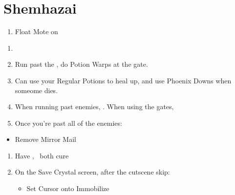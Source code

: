 \chapter{Shemhazai}

\begin{enumerate}
\item Float Mote on \vaan
\end{enumerate}
\begin{menu}
\party{\vaan, \basch}
\begin{itemize}
\battleslow
\end{itemize}
\end{menu}
\begin{enumerate}[resume]
	\item {}
	\item Run past the , do Potion Warps at the gate.
	\item Can use your Regular Potions to heal up, and use Phoenix Downs when someome dies.
	\item When running past enemies, \leader{\basch}. When using the gates, \leader{\vaan}
	\item Once you're past all of the enemies:
\end{enumerate}
\begin{menu}
\party{\vaan, \ashe, \penelo}
\begin{itemize}
\battlefast
\end{itemize}
\end{menu}
\begin{equip}
\begin{itemize}
\item Remove Mirror Mail
\end{itemize}
\end{equip}
\begin{enumerate}[resume]
\item Have \ashe, \penelo\ both cure \vaan
{}
\item On the Save Crystal screen, after the cutscene skip:
\begin{itemize}
\penelof Reflect \ashe
\penelof Reflect \penelo
\vaanf Protect \vaan
\decoy{\ashe}{\vaan}
\girlsout
\optimize{\vaan}
\item Set Cursor onto Immobilize
\end{itemize}
\end{enumerate}
